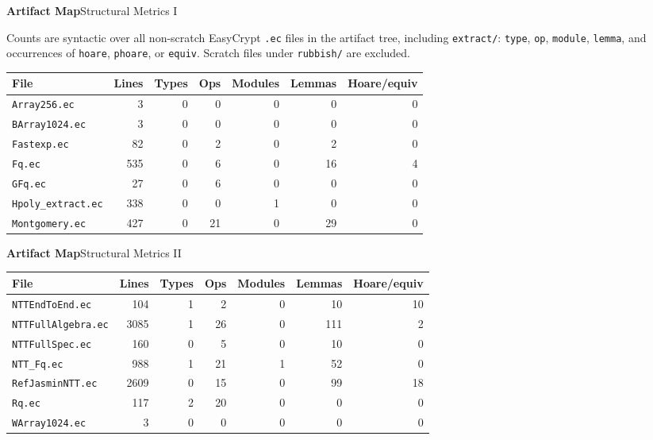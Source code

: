 \documentclass[10pt,aspectratio=1610,compress,dvipsnames]{beamer}
\newcommand{\ec}[1]{\texttt{#1}}
\begin{document}
\begin{frame}{\bfseries Artifact Map}{Structural Metrics I}
\begin{center}
\scriptsize
Counts are syntactic over all non-scratch EasyCrypt \ec{.ec} files in the
artifact tree, including \ec{extract/}:
\ec{type}, \ec{op}, \ec{module}, \ec{lemma}, and occurrences of
\ec{hoare}, \ec{phoare}, or \ec{equiv}.  Scratch files under \ec{rubbish/}
are excluded.
\end{center}

\vspace{4pt}
\begin{center}
\tiny\renewcommand{\arraystretch}{1.18}
\setlength{\tabcolsep}{4pt}
\begin{tabular}{lrrrrrr}
\toprule[1.2pt]
\textbf{File} & \textbf{Lines} & \textbf{Types} & \textbf{Ops} &
\textbf{Modules} & \textbf{Lemmas} & \textbf{Hoare/equiv} \\
\midrule
\ec{Array256.ec}      &    3 & 0 &  0 & 0 &   0 &  0 \\
\ec{BArray1024.ec}    &    3 & 0 &  0 & 0 &   0 &  0 \\
\ec{Fastexp.ec}       &   82 & 0 &  2 & 0 &   2 &  0 \\
\ec{Fq.ec}            &  535 & 0 &  6 & 0 &  16 &  4 \\
\ec{GFq.ec}           &   27 & 0 &  6 & 0 &   0 &  0 \\
\ec{Hpoly\_extract.ec}&  338 & 0 &  0 & 1 &   0 &  0 \\
\ec{Montgomery.ec}    &  427 & 0 & 21 & 0 &  29 &  0 \\
\bottomrule[1.2pt]
\end{tabular}
\end{center}
\end{frame}

\begin{frame}{\bfseries Artifact Map}{Structural Metrics II}
\begin{center}
\tiny\renewcommand{\arraystretch}{1.16}
\setlength{\tabcolsep}{4pt}
\begin{tabular}{lrrrrrr}
\toprule[1.2pt]
\textbf{File} & \textbf{Lines} & \textbf{Types} & \textbf{Ops} &
\textbf{Modules} & \textbf{Lemmas} & \textbf{Hoare/equiv} \\
\midrule
\ec{NTTEndToEnd.ec}    &  104 & 1 &  2 & 0 &  10 & 10 \\
\ec{NTTFullAlgebra.ec} & 3085 & 1 & 26 & 0 & 111 &  2 \\
\ec{NTTFullSpec.ec}    &  160 & 0 &  5 & 0 &  10 &  0 \\
\ec{NTT\_Fq.ec}        &  988 & 1 & 21 & 1 &  52 &  0 \\
\ec{RefJasminNTT.ec}   & 2609 & 0 & 15 & 0 &  99 & 18 \\
\ec{Rq.ec}             &  117 & 2 & 20 & 0 &   0 &  0 \\
\ec{WArray1024.ec}     &    3 & 0 &  0 & 0 &   0 &  0 \\
\bottomrule[1.2pt]
\end{tabular}
\end{center}
\end{frame}
\end{document}

